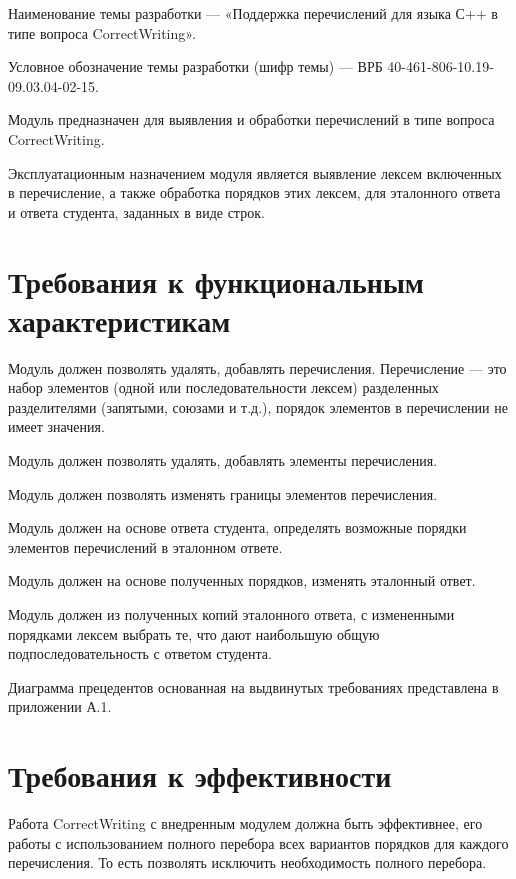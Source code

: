 \documentclass[a4paper,english]{G2-105}
\begin{document}
\par Наименование темы разработки — «Поддержка перечислений для языка С++ в типе вопроса CorrectWriting».
\par Условное обозначение темы разработки (шифр темы) — ВРБ 40-461-806-10.19-09.03.04-02-15.

\par Модуль предназначен для выявления и обработки перечислений в типе вопроса CorrectWriting.
\par Эксплуатационным назначением модуля является выявление лексем включенных в
перечисление, а также обработка порядков этих лексем, для эталонного ответа и ответа
студента, заданных в виде строк. 

\ttl
\section{Требования к функциональным характеристикам}
\par Модуль должен позволять удалять, добавлять перечисления. Перечисление — это набор элементов (одной или последовательности лексем) разделенных
разделителями (запятыми, союзами и т.д.), порядок элементов в перечислении  не имеет значения.
\par Модуль должен позволять удалять, добавлять элементы перечисления.
\par Модуль должен позволять изменять границы элементов перечисления.
\par Модуль должен на основе ответа студента, определять возможные порядки элементов перечислений в эталонном ответе.
\par Модуль должен на основе полученных порядков, изменять эталонный ответ.
\par Модуль должен из полученных копий эталонного ответа, с измененными порядками лексем выбрать те, что дают наибольшую общую подпоследовательность с ответом студента. 
\par Диаграмма прецедентов основанная на выдвинутых требованиях представлена в приложении А.1.

\section{Требования к эффективности}

\par Работа CorrectWriting с внедренным модулем должна быть эффективнее, его работы с использованием полного перебора всех вариантов порядков для каждого перечисления. 
То есть позволять исключить необходимость полного перебора.
\end{document}
